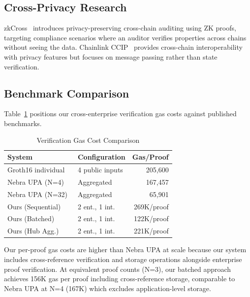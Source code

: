 \subsection{Cross-Privacy Research}

zkCross~\cite{zkcross2024} introduces privacy-preserving cross-chain auditing
using ZK proofs, targeting compliance scenarios where an auditor verifies
properties across chains without seeing the data. Chainlink
CCIP~\cite{chainlink2024ccip} provides cross-chain interoperability with
privacy features but focuses on message passing rather than state
verification.

\subsection{Benchmark Comparison}

Table~\ref{tab:benchmarks} positions our cross-enterprise verification gas
costs against published benchmarks.

\begin{table}[htbp]
\centering
\caption{Verification Gas Cost Comparison}
\label{tab:benchmarks}
\begin{tabular}{@{}llr@{}}
\toprule
System & Configuration & Gas/Proof \\
\midrule
Groth16 individual~\cite{nebra2024upa} & 4 public inputs & 205,600 \\
Nebra UPA (N=4)~\cite{nebra2024upa} & Aggregated & 167,457 \\
Nebra UPA (N=32)~\cite{nebra2024upa} & Aggregated & 65,901 \\
\midrule
Ours (Sequential) & 2 ent., 1 int. & 269K/proof \\
Ours (Batched) & 2 ent., 1 int. & 122K/proof \\
Ours (Hub Agg.) & 2 ent., 1 int. & 221K/proof \\
\bottomrule
\end{tabular}
\end{table}

Our per-proof gas costs are higher than Nebra UPA at scale because our system
includes cross-reference verification and storage operations alongside
enterprise proof verification. At equivalent proof counts (N=3), our batched
approach achieves 156K gas per proof including cross-reference storage,
comparable to Nebra UPA at N=4 (167K) which excludes application-level
storage.
